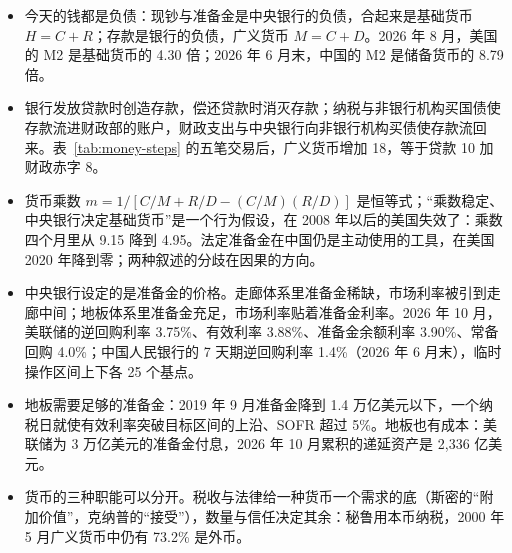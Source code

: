 \begin{takeaways}
\begin{itemize}
\item 今天的钱都是负债：现钞与准备金是中央银行的负债，合起来是基础货币 $H=C+R$；存款是银行的负债，广义货币 $M=C+D$。2026 年 8 月，美国的 M2 是基础货币的 4.30 倍；2026 年 6 月末，中国的 M2 是储备货币的 8.79 倍。
\item 银行发放贷款时创造存款，偿还贷款时消灭存款；纳税与非银行机构买国债使存款流进财政部的账户，财政支出与中央银行向非银行机构买债使存款流回来。表~\ref{tab:money-steps} 的五笔交易后，广义货币增加 18，等于贷款 10 加财政赤字 8。
\item 货币乘数 $m=1/[C/M+R/D-(C/M)(R/D)]$ 是恒等式；“乘数稳定、中央银行决定基础货币”是一个行为假设，在 2008 年以后的美国失效了：乘数四个月里从 9.15 降到 4.95。法定准备金在中国仍是主动使用的工具，在美国 2020 年降到零；两种叙述的分歧在因果的方向。
\item 中央银行设定的是准备金的价格。走廊体系里准备金稀缺，市场利率被引到走廊中间；地板体系里准备金充足，市场利率贴着准备金利率。2026 年 10 月，美联储的逆回购利率 3.75\%、有效利率 3.88\%、准备金余额利率 3.90\%、常备回购 4.0\%；中国人民银行的 7 天期逆回购利率 1.4\%（2026 年 6 月末），临时操作区间上下各 25 个基点。
\item 地板需要足够的准备金：2019 年 9 月准备金降到 1.4 万亿美元以下，一个纳税日就使有效利率突破目标区间的上沿、SOFR 超过 5\%。地板也有成本：美联储为 3 万亿美元的准备金付息，2026 年 10 月累积的递延资产是 2,336 亿美元。
\item 货币的三种职能可以分开。税收与法律给一种货币一个需求的底（斯密的“附加价值”，克纳普的“接受”），数量与信任决定其余：秘鲁用本币纳税，2000 年 5 月广义货币中仍有 73.2\% 是外币。
\end{itemize}
\end{takeaways}

